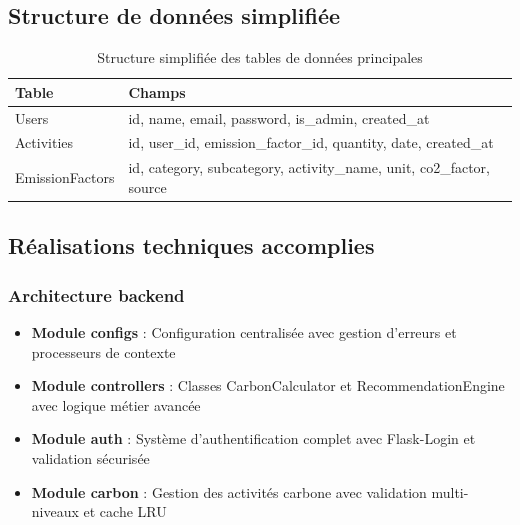 \documentclass[a4paper,11pt]{article}
\begin{document}
    \subsection{Structure de données simplifiée}

    \begin{table}[h!]
        \centering
        \caption{Structure simplifiée des tables de données principales}
        \begin{tabularx}{\textwidth}{|l|X|}
            \hline
            \textbf{Table} & \textbf{Champs} \\
            \hline
            Users & id, name, email, password, is\_admin, created\_at \\
            \hline
            Activities & id, user\_id, emission\_factor\_id, quantity, date, created\_at \\
            \hline
            EmissionFactors & id, category, subcategory, activity\_name, unit, co2\_factor, source \\
            \hline
        \end{tabularx}
    \end{table}

    \subsection{Réalisations techniques accomplies}

    \subsubsection{Architecture backend}
    \begin{itemize}
        \item \textbf{Module configs} : Configuration centralisée avec gestion d'erreurs et processeurs de contexte
        \item \textbf{Module controllers} : Classes CarbonCalculator et RecommendationEngine avec logique métier avancée
        \item \textbf{Module auth} : Système d'authentification complet avec Flask-Login et validation sécurisée
        \item \textbf{Module carbon} : Gestion des activités carbone avec validation multi-niveaux et cache LRU
    \end{itemize}
\end{document}
